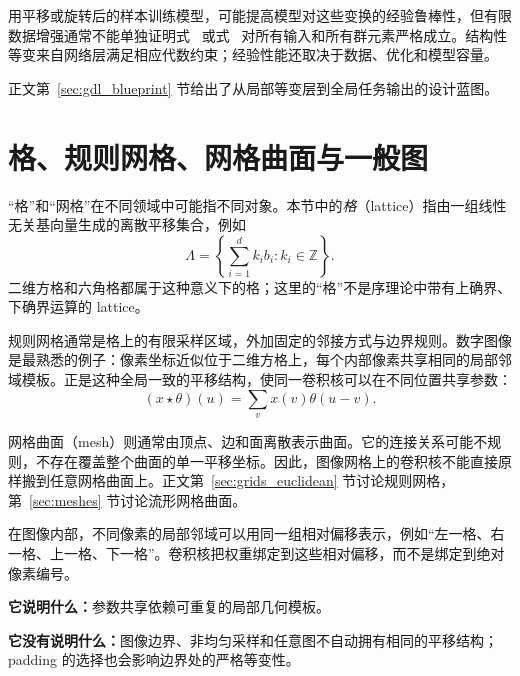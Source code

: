 \begin{tcolorbox}[width=\linewidth,colback=boxgray!35,colframe=darkgry,title=边界：数据增强不等于严格等变]
用平移或旋转后的样本训练模型，可能提高模型对这些变换的经验鲁棒性，但有限数据增强通常不能单独证明式~ 或式~ 对所有输入和所有群元素严格成立。结构性等变来自网络层满足相应代数约束；经验性能还取决于数据、优化和模型容量。
\end{tcolorbox}

正文第~\ref{sec:gdl_blueprint} 节给出了从局部等变层到全局任务输出的设计蓝图。

\section{格、规则网格、网格曲面与一般图}
\label{app:primer:lattices-grids}

“格”和“网格”在不同领域中可能指不同对象。本节中的\emph{格}（lattice）指由一组线性无关基向量生成的离散平移集合，例如
\begin{equation}
\Lambda=\left\{\sum_{i=1}^{d} k_i b_i: k_i\in\mathbb{Z}\right\}.
\label{app:primer:lattice}
\end{equation}
二维方格和六角格都属于这种意义下的格；这里的“格”不是序理论中带有上确界、下确界运算的 lattice。

规则网格通常是格上的有限采样区域，外加固定的邻接方式与边界规则。数字图像是最熟悉的例子：像素坐标近似位于二维方格上，每个内部像素共享相同的局部邻域模板。正是这种全局一致的平移结构，使同一卷积核可以在不同位置共享参数：
\begin{equation}
(x\star\theta)(u)=\sum_v x(v)\theta(u-v).
\label{app:primer:grid-convolution}
\end{equation}

网格曲面（mesh）则通常由顶点、边和面离散表示曲面。它的连接关系可能不规则，不存在覆盖整个曲面的单一平移坐标。因此，图像网格上的卷积核不能直接原样搬到任意网格曲面上。正文第~\ref{sec:grids_euclidean} 节讨论规则网格，第~\ref{sec:meshes} 节讨论流形网格曲面。

\begin{tcolorbox}[width=\linewidth,colback=boxgray!35,colframe=darkgry,title=深度学习实例：为什么 CNN 能共享卷积核]
在图像内部，不同像素的局部邻域可以用同一组相对偏移表示，例如“左一格、右一格、上一格、下一格”。卷积核把权重绑定到这些相对偏移，而不是绑定到绝对像素编号。

\textbf{它说明什么：}参数共享依赖可重复的局部几何模板。

\textbf{它没有说明什么：}图像边界、非均匀采样和任意图不自动拥有相同的平移结构；padding 的选择也会影响边界处的严格等变性。
\end{tcolorbox}

